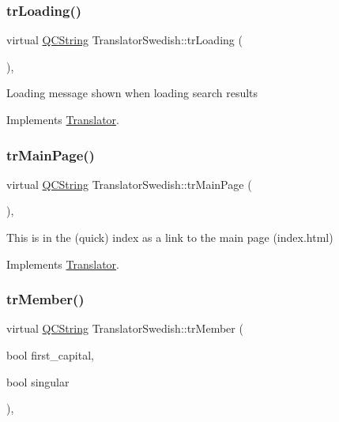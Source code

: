 \subsubsection{\texorpdfstring{trLoading()}{trLoading()}}
{\footnotesize\ttfamily virtual \mbox{\hyperlink{class_q_c_string}{Q\+C\+String}} Translator\+Swedish\+::tr\+Loading (\begin{DoxyParamCaption}{ }\end{DoxyParamCaption})\hspace{0.3cm}{\ttfamily [inline]}, {\ttfamily [virtual]}}

Loading message shown when loading search results 

Implements \mbox{\hyperlink{class_translator}{Translator}}.

\mbox{\label{class_translator_swedish_a95a1f622d928f04f8268806b07dc9c9b}} 
\subsubsection{\texorpdfstring{trMainPage()}{trMainPage()}}
{\footnotesize\ttfamily virtual \mbox{\hyperlink{class_q_c_string}{Q\+C\+String}} Translator\+Swedish\+::tr\+Main\+Page (\begin{DoxyParamCaption}{ }\end{DoxyParamCaption})\hspace{0.3cm}{\ttfamily [inline]}, {\ttfamily [virtual]}}

This is in the (quick) index as a link to the main page (index.\+html) 

Implements \mbox{\hyperlink{class_translator}{Translator}}.

\mbox{\label{class_translator_swedish_a0eeef1b59e1f6ccd48d7638f0064fb10}} 
\subsubsection{\texorpdfstring{trMember()}{trMember()}}
{\footnotesize\ttfamily virtual \mbox{\hyperlink{class_q_c_string}{Q\+C\+String}} Translator\+Swedish\+::tr\+Member (\begin{DoxyParamCaption}\item[{bool}]{first\+\_\+capital,  }\item[{bool}]{singular }\end{DoxyParamCaption})\hspace{0.3cm}{\ttfamily [inline]}, {\ttfamily [virtual]}}

